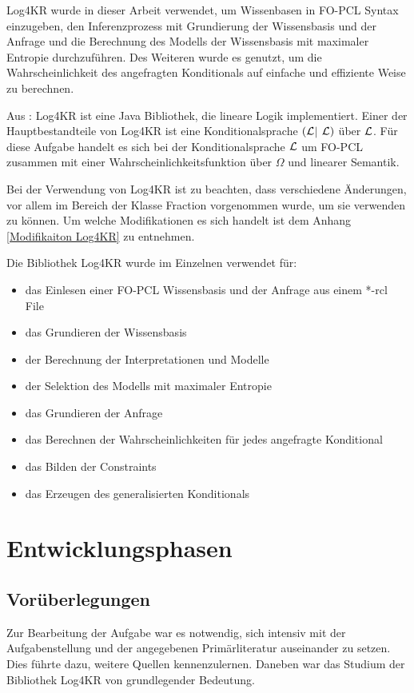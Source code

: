 \documentclass[a4paper, 11pt]{book}
\begin{document}
Log4KR wurde in dieser Arbeit verwendet, um Wissenbasen in FO-PCL Syntax einzugeben, den Inferenzprozess mit Grundierung der Wissensbasis und der Anfrage und die Berechnung des Modells der Wissensbasis mit maximaler Entropie durchzuführen. Des Weiteren wurde es genutzt, um die Wahrscheinlichkeit des angefragten Konditionals auf einfache und effiziente Weise zu berechnen.


Aus \cite{P15}: Log4KR ist eine Java Bibliothek, die lineare Logik implementiert. Einer der Hauptbestandteile von Log4KR ist eine Konditionalsprache $ (\cal L $$ \mid $  $ \cal L )$ über $ \cal L $. Für diese Aufgabe handelt es sich bei der Konditionalsprache $ \cal L $ um FO-PCL zusammen mit einer Wahrscheinlichkeitsfunktion über $ \Omega $ und linearer Semantik. 

Bei der Verwendung von Log4KR ist zu beachten, dass verschiedene Änderungen, vor allem im Bereich der Klasse Fraction vorgenommen wurde, um sie verwenden zu können. Um welche Modifikationen es sich handelt ist dem Anhang \ref{Modifikaiton Log4KR} zu entnehmen.


Die Bibliothek Log4KR wurde im Einzelnen verwendet für:\\
\begin{itemize}
	\item das Einlesen einer FO-PCL Wissensbasis und der Anfrage aus einem *-rcl File
	\item das Grundieren der Wissensbasis
	\item der Berechnung der Interpretationen und Modelle
	\item der Selektion des Modells mit maximaler Entropie
	\item das Grundieren der Anfrage
	\item das Berechnen der Wahrscheinlichkeiten für jedes angefragte Konditional
	\item das Bilden der Constraints 
	\item das Erzeugen des generalisierten Konditionals
\end{itemize}

\section{Entwicklungsphasen}
\subsection{Vorüberlegungen}
Zur Bearbeitung der Aufgabe war es notwendig, sich intensiv mit der Aufgabenstellung und der angegebenen Primärliteratur auseinander zu setzen. Dies führte dazu, weitere Quellen kennenzulernen. Daneben war das Studium der Bibliothek Log4KR von grundlegender Bedeutung. 
\end{document}
